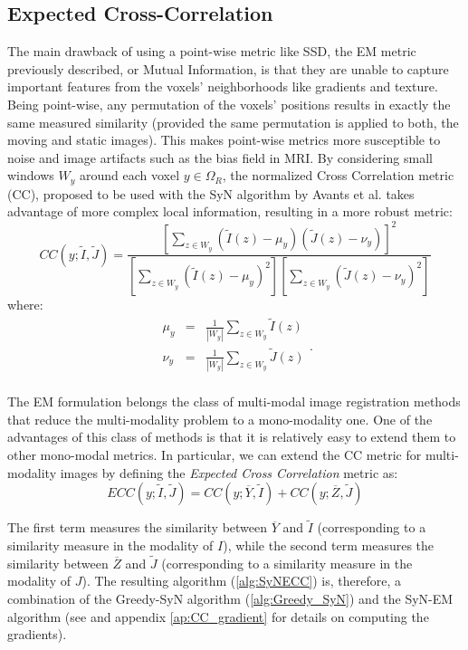\subsection{Expected Cross-Correlation}
The main drawback of using a point-wise metric like SSD, the EM metric previously described, or Mutual Information, is that
they are unable to capture important features from the voxels' neighborhoods like gradients and texture. Being point-wise, any permutation of the voxels' positions results in
exactly the same measured similarity (provided the same permutation is applied to both, the moving and static images). This makes point-wise metrics more susceptible to noise and
image artifacts such as the bias field in MRI. By considering small windows $W_{y}$ around each voxel $y\in\Omega_{R}$, the normalized Cross Correlation metric (CC), proposed to
be used with the SyN algorithm by Avants et al. \cite{Avants2008} takes advantage of more complex local information, resulting in a more robust metric:
\begin{equation}
    CC(y;\tilde{I}, \tilde{J}) = \frac{\left[\sum_{z\in W_{y}} \left(\tilde{I}(z) - \mu_{y}\right)\left(\tilde{J}(z) - \nu_{y}\right)\right]^{2}}
    {\left[\sum_{z \in W_{y}}\left(\tilde{I}(z) - \mu_{y}\right)^{2}\right] \left[\sum_{z \in W_{y}}\left(\tilde{J}(z) - \nu_{y}\right)^{2}\right]}
\end{equation}
where:
\begin{equation}
    \begin{array}{lll}
        \mu_{y} &=& \frac{1}{|W_{y}|}\sum_{z \in W_{y}}\tilde{I}(z)\\
        \nu_{y} &=& \frac{1}{|W_{y}|}\sum_{z \in W_{y}}\tilde{J}(z)\\
    \end{array}.
\end{equation}

The EM formulation belongs the class of multi-modal image registration methods that reduce the multi-modality problem to a mono-modality one\cite{Sotiras2013}. One of the
advantages of this class of methods is that it is relatively easy to extend them to other mono-modal metrics. In particular, we can extend the CC metric for multi-modality images
by defining the {\it Expected Cross Correlation} metric as:
\begin{equation}
    ECC(y;\tilde{I}, \tilde{J}) = CC(y; \overline{Y}, \tilde{I}) + CC(y; \overline{Z}, \tilde{J})
\end{equation}

The first term measures the similarity between $\overline{Y}$ and $\tilde{I}$ (corresponding to a similarity measure in the modality of $I$), while the second term measures the
similarity between $\overline{Z}$ and $\tilde{J}$ (corresponding to a similarity measure in the modality of $J$). The resulting algorithm (\ref{alg:SyNECC})
is, therefore, a combination of the Greedy-SyN algorithm (\ref{alg:Greedy_SyN}) and the SyN-EM algorithm (see \cite{Avants2008} and appendix \ref{ap:CC_gradient} for details on
computing the gradients).

